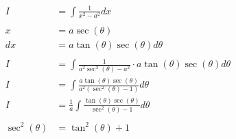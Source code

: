 \documentclass[12pt]{article}
\begin{document}
\begin{align}
    I                                                      & = \int \frac{1}{x^2-a^2} dx                                                                                                                                   \\
    \nonumber                                                                                                                                                                                                              \\
    x                                                      & = a\sec(\theta)                                                                                                                                               \\
    dx                                                     & = a\tan(\theta)\sec(\theta) d\theta                                                                                                                           \\
    \nonumber                                                                                                                                                                                                              \\
    I                                                      & = \int \frac{1}{a^2\sec^2(\theta)-a^2} \cdot a\tan(\theta)\sec(\theta) d\theta                                                                                \\
    I                                                      & = \int \frac{a\tan(\theta)\sec(\theta)}{a^2(\sec^2(\theta)-1)}  d\theta                                                                                       \\
    I                                                      & = \frac{1}{a} \int \frac{\tan(\theta)\sec(\theta)}{\sec^2(\theta)-1}  d\theta                                                                                 \\
    \nonumber                                                                                                                                                                                                              \\
    \sec^2(\theta)                                         & = \tan^2(\theta) + 1                                                                                                                                          \\

\end{align}
\end{document}
